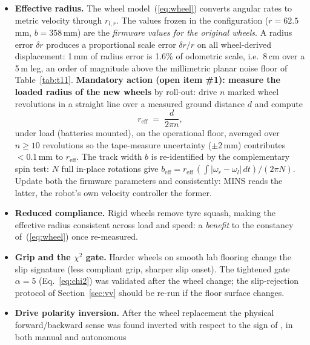 \begin{itemize}
  \item \textbf{Effective radius.} The wheel model~(\ref{eq:wheel}) converts
        angular rates to metric velocity through $r_{l,r}$. The values frozen
        in the configuration ($r = 62.5$\,mm, $b = 358$\,mm) are the
        \emph{firmware values for the original wheels}. A radius error
        $\delta r$ produces a proportional scale error $\delta r / r$ on all
        wheel-derived displacement: 1\,mm of radius error is 1.6\% of
        odometric scale, i.e.\ 8\,cm over a 5\,m leg, an order of magnitude
        above the millimetric planar noise floor of Table~\ref{tab:t11}.
        \textbf{Mandatory action (open item \#1): measure the loaded radius of
        the new wheels} by roll-out: drive $n$ marked wheel revolutions in a
        straight line over a measured ground distance $d$ and compute
        \begin{equation}
        r_{\mathrm{eff}} \;=\; \frac{d}{2\pi n},
        \end{equation}
        under load (batteries mounted), on the operational floor, averaged
        over $n \ge 10$ revolutions so the tape-measure uncertainty
        ($\pm$2\,mm) contributes $<0.1$\,mm to $r_{\mathrm{eff}}$. The track
        width $b$ is re-identified by the complementary spin test: $N$
        full in-place rotations give
        $b_{\mathrm{eff}} = r_{\mathrm{eff}}\,
        (\int|\omega_r - \omega_l|\,dt)/(2\pi N)$. Update both the firmware
         parameters and 
        consistently: MINS reads the latter, the robot's own velocity
        controller the former.
  \item \textbf{Reduced compliance.} Rigid wheels remove tyre squash, making
        the effective radius consistent across load and speed: a
        \emph{benefit} to the constancy of~(\ref{eq:wheel}) once re-measured.
  \item \textbf{Grip and the $\chi^2$ gate.} Harder wheels on smooth lab
        flooring change the slip signature (less compliant grip, sharper
        slip onset). The tightened gate $\alpha{=}5$
        (Eq.~\ref{eq:chi2}) was validated after the wheel change; the
        slip-rejection protocol of Section~\ref{sec:vv} should be re-run if
        the floor surface changes.
  \item \textbf{Drive polarity inversion.} After the wheel replacement the
        physical forward/backward sense was found inverted with respect to
        the sign of , in both manual and autonomous

\end{itemize}
